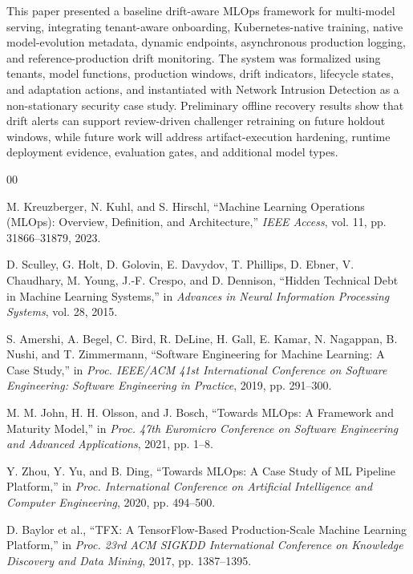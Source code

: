 \documentclass[runningheads]{llncs}
\begin{document}
This paper presented a baseline drift-aware MLOps framework for multi-model serving, integrating tenant-aware onboarding, Kubernetes-native training, native model-evolution metadata, dynamic endpoints, asynchronous production logging, and reference-production drift monitoring. The system was formalized using tenants, model functions, production windows, drift indicators, lifecycle states, and adaptation actions, and instantiated with Network Intrusion Detection as a non-stationary security case study. Preliminary offline recovery results show that drift alerts can support review-driven challenger retraining on future holdout windows, while future work will address artifact-execution hardening, runtime deployment evidence, evaluation gates, and additional model types.

\begin{thebibliography}{00}

M. Kreuzberger, N. Kuhl, and S. Hirschl, ``Machine Learning Operations (MLOps): Overview, Definition, and Architecture,'' \textit{IEEE Access}, vol. 11, pp. 31866--31879, 2023.

D. Sculley, G. Holt, D. Golovin, E. Davydov, T. Phillips, D. Ebner,
V. Chaudhary, M. Young, J.-F. Crespo, and D. Dennison,
``Hidden Technical Debt in Machine Learning Systems,''
in \textit{Advances in Neural Information Processing Systems}, vol. 28, 2015.

S. Amershi, A. Begel, C. Bird, R. DeLine, H. Gall, E. Kamar,
N. Nagappan, B. Nushi, and T. Zimmermann,
``Software Engineering for Machine Learning: A Case Study,''
in \textit{Proc. IEEE/ACM 41st International Conference on Software Engineering:
Software Engineering in Practice}, 2019, pp. 291--300.

M. M. John, H. H. Olsson, and J. Bosch, ``Towards MLOps: A Framework and Maturity Model,'' in \textit{Proc. 47th Euromicro Conference on Software Engineering and Advanced Applications}, 2021, pp. 1--8.

Y. Zhou, Y. Yu, and B. Ding, ``Towards MLOps: A Case Study of ML Pipeline Platform,'' in \textit{Proc. International Conference on Artificial Intelligence and Computer Engineering}, 2020, pp. 494--500.

D. Baylor et al.,
``TFX: A TensorFlow-Based Production-Scale Machine Learning Platform,''
in \textit{Proc. 23rd ACM SIGKDD International Conference on Knowledge Discovery and Data Mining},
2017, pp. 1387--1395.


\end{thebibliography}
\end{document}
